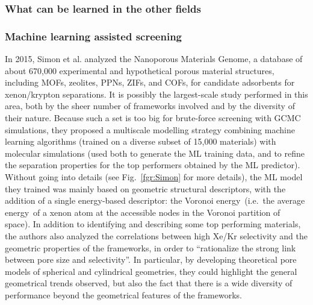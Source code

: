 \documentclass[main.tex]{subfiles}
\begin{document}

\subsubsection{What can be learned in the other fields}


\subsubsection{Machine learning assisted screening}


In 2015, Simon et al.\cite{Simon_2015} analyzed the Nanoporous Materials Genome,\cite{Simon_2015_EES, Boyd_2017} a database of about 670,000 experimental and hypothetical porous material structures, including MOFs, zeolites, PPNs, ZIFs, and COFs, for candidate adsorbents for xenon/krypton separations. It is possibly the largest-scale study performed in this area, both by the sheer number of frameworks involved and by the diversity of their nature. Because such a set is too big for brute-force screening with GCMC simulations, they proposed a multiscale modelling strategy combining machine learning algorithms (trained on a diverse subset of 15,000 materials) with molecular simulations (used both to generate the ML training data, and to refine the separation properties for the top performers obtained by the ML predictor). Without going into details (see Fig.~\ref{fgr:Simon} for more details), the ML model they trained was mainly based on geometric structural descriptors, with the addition of a single energy-based descriptor: the Voronoi energy\ (i.e.\ the average energy\ of a xenon atom at the accessible nodes in the Voronoi partition of space). In addition to identifying and describing some top performing materials, the authors also analyzed the correlations between high Xe/Kr selectivity and the geometric properties of the frameworks, in order to ``rationalize the strong link between pore size and selectivity''. In particular, by developing theoretical pore models of spherical and cylindrical geometries, they could highlight the general geometrical trends observed, but also the fact that there is a wide diversity of performance beyond the geometrical features of the frameworks.
\end{document}
